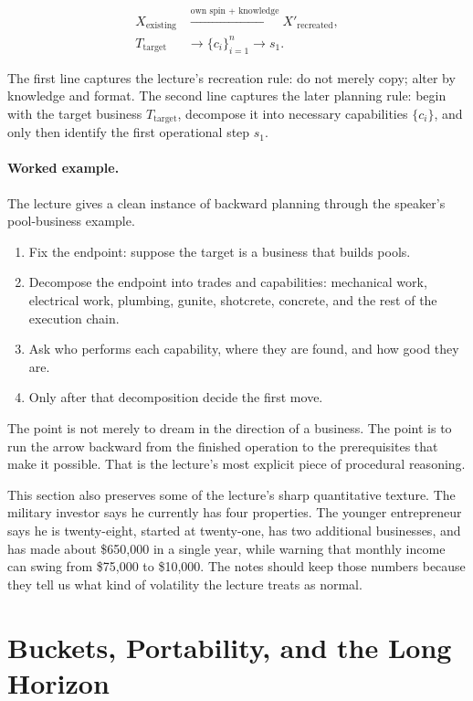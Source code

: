 \begin{align}
X_{\mathrm{existing}} &\xrightarrow{\text{own spin + knowledge}} X'_{\mathrm{recreated}},\\
T_{\mathrm{target}} &\to \{c_i\}_{i=1}^{n} \to s_1.
\end{align}

The first line captures the lecture's recreation rule: do not merely copy; alter by knowledge and format. The second line captures the later planning rule: begin with the target business \(T_{\mathrm{target}}\), decompose it into necessary capabilities \(\{c_i\}\), and only then identify the first operational step \(s_1\).

\paragraph{Worked example.} The lecture gives a clean instance of backward planning through the speaker's pool-business example.
\begin{enumerate}
\item Fix the endpoint: suppose the target is a business that builds pools.
\item Decompose the endpoint into trades and capabilities: mechanical work, electrical work, plumbing, gunite, shotcrete, concrete, and the rest of the execution chain.
\item Ask who performs each capability, where they are found, and how good they are.
\item Only after that decomposition decide the first move.
\end{enumerate}

The point is not merely to dream in the direction of a business. The point is to run the arrow backward from the finished operation to the prerequisites that make it possible. That is the lecture's most explicit piece of procedural reasoning.

This section also preserves some of the lecture's sharp quantitative texture. The military investor says he currently has four properties. The younger entrepreneur says he is twenty-eight, started at twenty-one, has two additional businesses, and has made about \$650{,}000 in a single year, while warning that monthly income can swing from \$75{,}000 to \$10{,}000. The notes should keep those numbers because they tell us what kind of volatility the lecture treats as normal.

\section{Buckets, Portability, and the Long Horizon}

